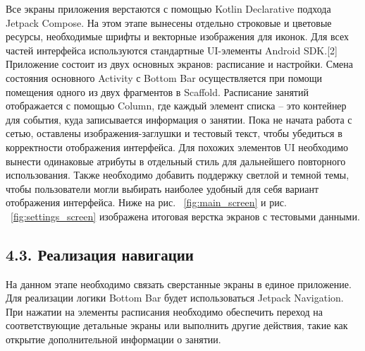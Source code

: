 \documentclass{vsureport}
\begin{document}
Все экраны приложения верстаются с помощью Kotlin Declarative подхода Jetpack Compose. На этом этапе вынесены отдельно строковые и цветовые ресурсы, необходимые шрифты и векторные изображения для иконок. Для всех частей интерфейса используются стандартные UI-элементы Android SDK.[2]
Приложение состоит из двух основных экранов: расписание и настройки. Смена состояния основного Activity с Bottom Bar осуществляется при помощи помещения одного из двух фрагментов в Scaffold. Расписание занятий отображается с помощью Column, где каждый элемент списка – это контейнер для события, куда записывается информация о занятии. Пока не начата работа с сетью, оставлены изображения-заглушки и тестовый текст, чтобы убедиться в корректности отображения интерфейса. \cite{ref8}
Для похожих элементов UI необходимо вынести одинаковые атрибуты в отдельный стиль для дальнейшего повторного использования. Также необходимо добавить поддержку светлой и темной темы, чтобы пользователи могли выбирать наиболее удобный для себя вариант отображения интерфейса. Ниже на рис. ~\ref{fig:main_screen} и рис. ~\ref{fig:settings_screen} изображена итоговая верстка экранов с тестовыми данными. \cite{ref2}


\subsection*{4.3. Реализация навигации}
На данном этапе необходимо связать сверстанные экраны в единое приложение. Для реализации логики Bottom Bar будет использоваться Jetpack Navigation. При нажатии на элементы расписания необходимо обеспечить переход на соответствующие детальные экраны или выполнить другие действия, такие как открытие дополнительной информации о занятии. \cite{ref8}
\end{document}
